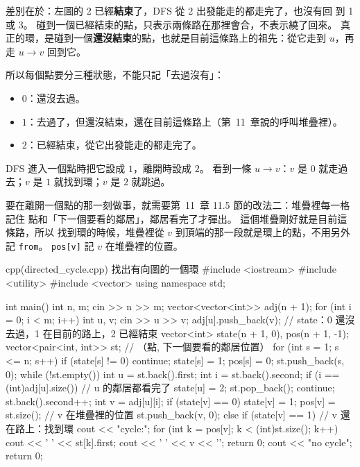 差別在於：左圖的 2 已經\textbf{結束}了，DFS 從 2 出發能走的都走完了，也沒有回
到 1 或 3。 碰到一個已經結束的點，只表示兩條路在那裡會合，不表示繞了回來。 真
正的環，是碰到一個\textbf{還沒結束}的點，也就是目前這條路上的祖先：從它走到
$u$，再走 $u \to v$ 回到它。

所以每個點要分三種狀態，不能只記「去過沒有」：

\begin{itemize}
\item $0$：還沒去過。
\item $1$：去過了，但還沒結束，還在目前這條路上（第~11~章說的呼叫堆疊裡）。
\item $2$：已經結束，從它出發能走的都走完了。
\end{itemize}

DFS 進入一個點時把它設成 $1$，離開時設成 $2$。 看到一條 $u \to v$：$v$ 是 $0$
就走過去；$v$ 是 $1$ 就找到環；$v$ 是 $2$ 就跳過。

要在離開一個點的那一刻做事，就需要第~11~章 11.5 節的改法二：堆疊裡每一格記住
點和「下一個要看的鄰居」，鄰居看完了才彈出。 這個堆疊剛好就是目前這條路，所以
找到環的時候，堆疊裡從 $v$ 到頂端的那一段就是環上的點，不用另外記
\texttt{from}。 \texttt{pos[v]} 記 $v$ 在堆疊裡的位置。

\begin{example}[label=ex:directed-cycle]{cpp}{(directed\_cycle.cpp) 找出有向圖的一個環}
#include <iostream>
#include <utility>
#include <vector>
using namespace std;

int main() {
    int n, m;
    cin >> n >> m;
    vector<vector<int>> adj(n + 1);
    for (int i = 0; i < m; i++) {
        int u, v;
        cin >> u >> v;
        adj[u].push_back(v);
    }
    // state：0 還沒去過，1 在目前的路上，2 已經結束
    vector<int> state(n + 1, 0), pos(n + 1, -1);
    vector<pair<int, int>> st;             // （點, 下一個要看的鄰居位置）
    for (int s = 1; s <= n; s++) {
        if (state[s] != 0) {
            continue;
        }
        state[s] = 1;
        pos[s] = 0;
        st.push_back({s, 0});
        while (!st.empty()) {
            int u = st.back().first;
            int i = st.back().second;
            if (i == (int)adj[u].size()) {     // u 的鄰居都看完了
                state[u] = 2;
                st.pop_back();
                continue;
            }
            st.back().second++;
            int v = adj[u][i];
            if (state[v] == 0) {
                state[v] = 1;
                pos[v] = st.size();            // v 在堆疊裡的位置
                st.push_back({v, 0});
            } else if (state[v] == 1) {        // v 還在路上：找到環
                cout << "cycle:";
                for (int k = pos[v]; k < (int)st.size(); k++) {
                    cout << ' ' << st[k].first;
                }
                cout << ' ' << v << '\n';
                return 0;
            }
        }
    }
    cout << "no cycle\n";
    return 0;
}
\end{example}

